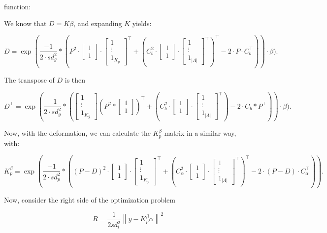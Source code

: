 \documentclass[12pt]{article}
\newcommand{\A}{\alpha}
\newcommand{\B}{\beta}
\newcommand{\longones}[1]{
  \begin{bmatrix}
    1\\
    \vdots\\
    1_{#1}
  \end{bmatrix}
}
\begin{document}
 function:

We know that $D = K\beta$, and expanding $K$ yields:

\begin{dmath*}
  D = \exp\left(\frac{-1}{2\cdot sd_g^2} * \left({P^{2}\cdot 
  \begin{bmatrix}
    1\\
    1
  \end{bmatrix} \cdot 
  \longones{K_g}^\top} 
  + {(C_b^{2}\cdot 
  \begin{bmatrix}
    1\\
    1
  \end{bmatrix}
  \cdot 
  \longones{|\Lambda|}
  ^\top )^\top} 
  -2\cdot P\cdot C_b^\top \right)  \right) \cdot \B).
\end{dmath*}

The transpose of $D$ is then


\begin{dmath*}
  D^\top = \exp\left(\frac{-1}{2\cdot sd_g^2} * \left({\longones{K_g}
  \left(P^{2} *  
  \begin{bmatrix}
    1\\
    1
  \end{bmatrix} \right)^\top
  } 
  + {(C_b^{2}\cdot 
  \begin{bmatrix}
    1\\
    1
  \end{bmatrix}
  \cdot 
  \longones{|\Lambda|}
  ^\top )} 
  -2\cdot C_b * P ^\top \right)  \right) \cdot \B).
\end{dmath*}


Now, with the deformation, we can calculate the $K_p^\beta$ matrix in a similar way, with:

\begin{dmath*}
  K_p^\beta = \exp\left(\frac{-1}{2\cdot sd_p^2} * \left({(P-D)^{2}\cdot 
  \begin{bmatrix}
    1\\
    1
  \end{bmatrix} \cdot 
  \longones{K_p}^\top} 
  + {(C_\A^{2}\cdot 
  \begin{bmatrix}
    1\\
    1
  \end{bmatrix}
  \cdot 
  \longones{|\Lambda|}
  ^\top )^\top} 
  -2\cdot (P-D)\cdot C_\A^\top \right)  \right).
\end{dmath*}

Now, consider the right side of the optimization problem

\begin{dmath*}
  R = \frac{1}{2sd_l^2} 
  \left\| 
  y - K_p^\B\A
  \right\|^2
\end{dmath*}
\end{document}
